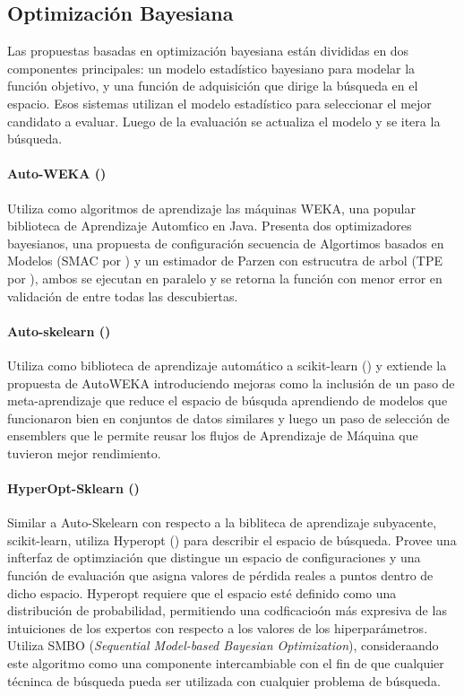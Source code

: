 \subsection{Optimizaci\'on Bayesiana}
Las propuestas basadas en optimizaci\'on bayesiana est\'an divididas en dos componentes principales: un modelo estad\'istico bayesiano para modelar la funci\'on objetivo, y una funci\'on de adquisici\'on que dirige la b\'usqueda en el espacio. Esos sistemas utilizan el modelo estad\'istico para seleccionar el mejor candidato a evaluar. Luego de la evaluaci\'on se actualiza el modelo y se itera la b\'usqueda.

\paragraph{Auto-WEKA (\cite{thornton2013auto})} Utiliza como algoritmos de aprendizaje las m\'aquinas WEKA, una popular biblioteca de Aprendizaje Autom\'tico en Java. Presenta dos optimizadores bayesianos, una propuesta de configuraci\'on secuencia de Algortimos basados en Modelos (SMAC por \cite{hutter2011sequential}) y un estimador de Parzen con estrucutra de arbol (TPE por \cite{bergstra2011algorithms}), ambos se ejecutan en paralelo y se retorna la funci\'on con menor error en validaci\'on de entre todas las descubiertas.

\paragraph*{Auto-skelearn (\cite{feurer2015efficient})} Utiliza como biblioteca de aprendizaje autom\'atico a scikit-learn (\cite{pedregosa2011scikit}) y extiende la propuesta de AutoWEKA  introduciendo mejoras como la inclusi\'on de un paso de meta-aprendizaje que reduce el espacio de b\'usquda aprendiendo de modelos que funcionaron bien en conjuntos de datos similares y luego un paso de selecci\'on de ensemblers que le permite reusar los flujos de Aprendizaje de M\'aquina que tuvieron mejor rendimiento. 

\paragraph*{HyperOpt-Sklearn (\cite{komer2014hyperopt})} Similar a Auto-Skelearn con respecto a la bibliteca de aprendizaje subyacente, scikit-learn, utiliza Hyperopt (\cite{bergstra2013hyperopt}) para describir el espacio de b\'usqueda. Provee una infterfaz de optimziaci\'on que distingue un espacio de configuraciones y una funci\'on de evaluaci\'on que asigna valores de p\'erdida reales a puntos dentro de dicho espacio. Hyperopt requiere que el espacio est\'e definido como una distribuci\'on de probabilidad, permitiendo una codficacio\'on m\'as expresiva de las intuiciones de los expertos con respecto a los valores de los hiperpar\'ametros. Utiliza SMBO (\textit{Sequential Model-based Bayesian Optimization}), consideraando este algoritmo como una componente intercambiable con el fin de que cualquier t\'ecninca de b\'usqueda pueda ser utilizada con cualquier problema de b\'usqueda.

